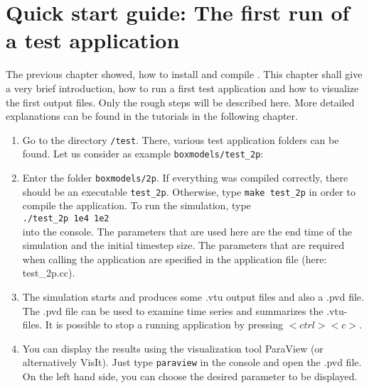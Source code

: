 \section[Quick start guide]{Quick start guide: The first run of a test application}\label{quick-start-guide}

The previous chapter showed, how to install and compile \Dumux. This chapter shall give a very brief introduction, how to run a first test application and how to visualize the first output files. Only the rough steps will be described here. More detailed explanations can be found in the tutorials in the following chapter.

\begin{enumerate}
 \item Go to the directory \texttt{/test}. There, various test application folders can be found. Let us consider as example \texttt{boxmodels/test{\_}2p}:
 \item Enter the folder \texttt{boxmodels/2p}. If everything was compiled correctly, there should be an executable \texttt{test{\_}2p}. Otherwise, type \texttt{make test{\_}2p} in order to compile the application. To run the simulation, type\\ 
\texttt{./test{\_}2p 1e4 1e2}\\
into the console. The parameters that are used here are the end time of the simulation and the initial timestep size. The parameters that are required when calling the application are specified in the application file (here: test{\_}2p.cc).
 \item The simulation starts and produces some .vtu output files and also a .pvd file. The .pvd file can be used to examine time series and summarizes the .vtu-files. It is possible to stop a running application by pressing $<ctrl><c>$.
 \item You can display the results using the visualization tool ParaView (or alternatively VisIt). Just type \texttt{paraview} in the console and open the .pvd file. On the left hand side, you can choose the desired parameter to be displayed.
\end{enumerate}
% 
%
%



